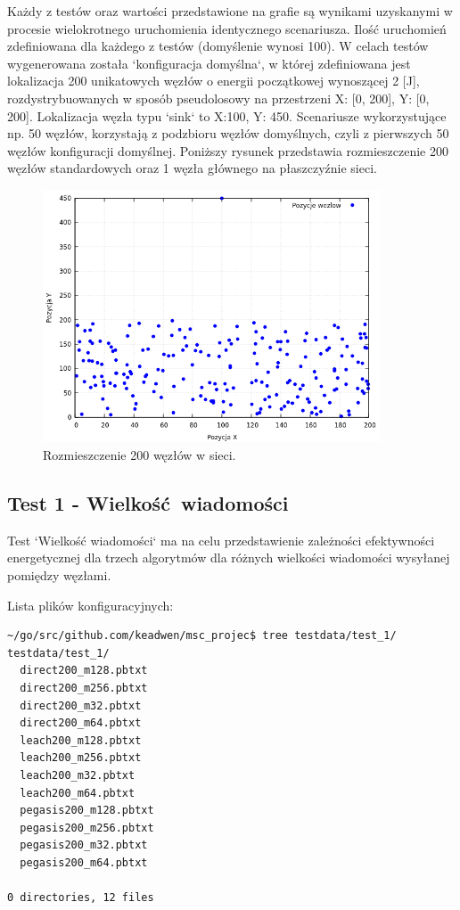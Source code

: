 \documentclass[a4paper,12pt,twoside,openany]{report}
\begin{document}
Każdy z testów oraz wartości przedstawione na grafie są wynikami uzyskanymi w procesie wielokrotnego uruchomienia identycznego scenariusza. 
Ilość uruchomień zdefiniowana dla każdego z testów (domyślenie wynosi 100).
W celach testów wygenerowana została `konfiguracja domyślna`, w której zdefiniowana jest lokalizacja 200 unikatowych węzłów o energii początkowej wynoszącej 2 [J], 
rozdystrybuowanych w sposób pseudolosowy na przestrzeni X: [0, 200], Y: [0, 200]. Lokalizacja węzła typu `sink` to X:100, Y: 450.
Scenariusze wykorzystujące np. 50 węzłów, korzystają z podzbioru węzłów domyślnych, czyli z pierwszych 50 węzłów konfiguracji domyślnej.
Poniższy rysunek przedstawia rozmieszczenie 200 węzłów standardowych oraz 1 węzła głównego na płaszczyźnie sieci.

\begin{figure}[H]
 \centering
 \includegraphics[width=10cm]{images/scenariusz_lokalizacja.png}
 \caption{Rozmieszczenie 200 węzłów w sieci.}
\end{figure}

\subsection{Test 1 - Wielkość wiadomości}

Test `Wielkość wiadomości` ma na celu przedstawienie zależności efektywności energetycznej dla trzech algorytmów dla różnych wielkości wiadomości wysyłanej pomiędzy węzłami.

Lista plików konfiguracyjnych:

\begin{lstlisting}
~/go/src/github.com/keadwen/msc_projec$ tree testdata/test_1/
testdata/test_1/
  direct200_m128.pbtxt
  direct200_m256.pbtxt
  direct200_m32.pbtxt
  direct200_m64.pbtxt
  leach200_m128.pbtxt
  leach200_m256.pbtxt
  leach200_m32.pbtxt
  leach200_m64.pbtxt
  pegasis200_m128.pbtxt
  pegasis200_m256.pbtxt
  pegasis200_m32.pbtxt
  pegasis200_m64.pbtxt

0 directories, 12 files
\end{lstlisting}
\end{document}
